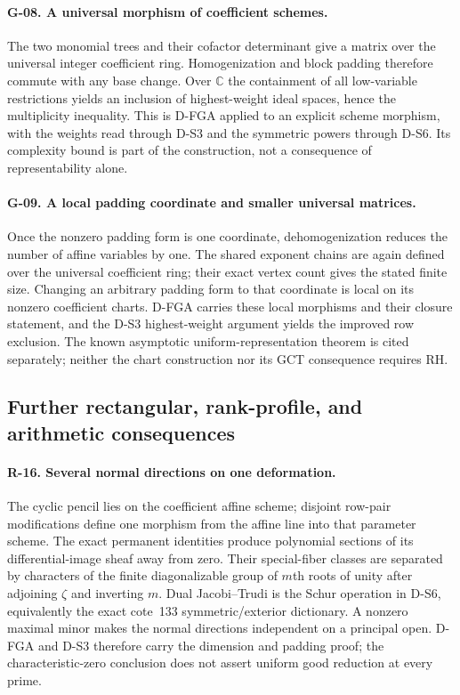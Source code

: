 \documentclass[11pt,a4paper]{article}
\theoremstyle{definition}\newtheorem{definition}{Definition}
\begin{document}
\paragraph{G-08. A universal morphism of coefficient schemes.}
The two monomial trees and their cofactor determinant give a matrix over the universal integer coefficient ring. Homogenization and block padding therefore commute with any base change. Over $\mathbb C$ the containment of all low-variable restrictions yields an inclusion of highest-weight ideal spaces, hence the multiplicity inequality. This is D-FGA applied to an explicit scheme morphism, with the weights read through D-S3 and the symmetric powers through D-S6. Its complexity bound is part of the construction, not a consequence of representability alone.

\paragraph{G-09. A local padding coordinate and smaller universal matrices.}
Once the nonzero padding form is one coordinate, dehomogenization reduces the number of affine variables by one. The shared exponent chains are again defined over the universal coefficient ring; their exact vertex count gives the stated finite size. Changing an arbitrary padding form to that coordinate is local on its nonzero coefficient charts. D-FGA carries these local morphisms and their closure statement, and the D-S3 highest-weight argument yields the improved row exclusion. The known asymptotic uniform-representation theorem is cited separately; neither the chart construction nor its GCT consequence requires RH.


\subsection{Further rectangular, rank-profile, and arithmetic consequences}

\paragraph{R-16. Several normal directions on one deformation.}
The cyclic pencil lies on the coefficient affine scheme; disjoint row-pair modifications define one morphism from the affine line into that parameter scheme. The exact permanent identities produce polynomial sections of its differential-image sheaf away from zero. Their special-fiber classes are separated by characters of the finite diagonalizable group of $m$th roots of unity after adjoining $\zeta$ and inverting $m$. Dual Jacobi--Trudi is the Schur operation in D-S6, equivalently the exact cote~133 symmetric/exterior dictionary. A nonzero maximal minor makes the normal directions independent on a principal open. D-FGA and D-S3 therefore carry the dimension and padding proof; the characteristic-zero conclusion does not assert uniform good reduction at every prime.
\end{document}
